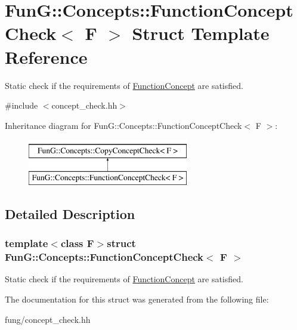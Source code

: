 \hypertarget{structFunG_1_1Concepts_1_1FunctionConceptCheck}{\section{Fun\-G\-:\-:Concepts\-:\-:Function\-Concept\-Check$<$ F $>$ Struct Template Reference}
\label{structFunG_1_1Concepts_1_1FunctionConceptCheck}
}


Static check if the requirements of \hyperlink{structFunG_1_1Concepts_1_1FunctionConcept}{Function\-Concept} are satisfied.  




{\ttfamily \#include $<$concept\-\_\-check.\-hh$>$}

Inheritance diagram for Fun\-G\-:\-:Concepts\-:\-:Function\-Concept\-Check$<$ F $>$\-:\begin{figure}[H]
\begin{center}
\leavevmode
\includegraphics[height=2.000000cm]{structFunG_1_1Concepts_1_1FunctionConceptCheck}
\end{center}
\end{figure}


\subsection{Detailed Description}
\subsubsection*{template$<$class F$>$struct Fun\-G\-::\-Concepts\-::\-Function\-Concept\-Check$<$ F $>$}

Static check if the requirements of \hyperlink{structFunG_1_1Concepts_1_1FunctionConcept}{Function\-Concept} are satisfied. 

The documentation for this struct was generated from the following file\-:\begin{DoxyCompactItemize}
\item 
fung/concept\-\_\-check.\-hh\end{DoxyCompactItemize}
